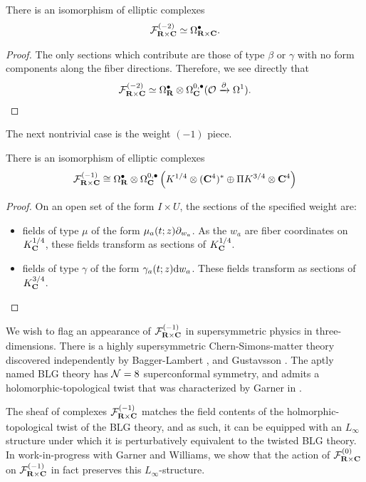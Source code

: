 \documentclass[../main.tex]{subfiles}
\begin{document}
\begin{lem}
There is an isomorphism of elliptic complexes \[\mathcal{F}^{(-2)}_{\mathbf{R}\times \mathbf{C}} \simeq \Omega^\bullet_{\mathbf{R}\times \mathbf{C}}.\]
\end{lem}
\begin{proof}
The only sections which contribute are those of type $\beta$ or $\gamma$ with no form components along the fiber directions. Therefore, we see directly that \[\mathcal{F}^{(-2)}_{\mathbf{R}\times \mathbf{C}} \simeq \Omega^\bullet _{\mathbf{R}} \otimes \Omega^{0,\bullet}_{\mathbf{C}} ( \mathcal{O} \xrightarrow{\partial} \Omega^1 ).\] 
\end{proof}

\parsec[] The next nontrivial case is the weight ${(-1)}$ piece. 

\begin{lem}
There is an isomorphism of elliptic complexes 
\[ \mathcal{F}^{(-1)}_{\mathbf{R}\times \mathbf{C}} \cong \Omega^\bullet _{\mathbf{R}} \otimes \Omega^{0,\bullet}_{\mathbf{C}} \left (K^{1/4}\otimes (\mathbf{C}^4)^* \oplus \Pi K^{3/4}\otimes \mathbf{C}^4 \right ) \]
\end{lem}
\begin{proof}
On an open set of the form $I\times U$, the sections of the specified weight are:
\begin{itemize}
\item fields of type $\mu$ of the form $\mu_a(t; z) \partial_{w_a}$. As the $w_a$ are fiber coordinates on $K^{1/4}_{\mathbf{C}}$, these fields transform as sections of $K^{1/4}_{\mathbf{C}}$.
\item fields of type $\gamma$ of the form $\gamma_a(t;z) \mathrm{d} w_a$. These fields transform as sections of $K^{3/4}_{\mathbf{C}}$. 
\end{itemize}
\end{proof}

\parsec[]
We wish to flag an appearance of $\mathcal{F}^{(-1)}_{\mathbf{R}\times \mathbf{C}}$ in supersymmetric physics in three-dimensions. There is a highly supersymmetric Chern-Simons-matter theory discovered independently by Bagger-Lambert \cite{Bagger_2007}, \cite{Bagger:2007jr} and Gustavsson \cite{Gustavsson:2007vu}. The aptly named BLG theory has $\mathcal{N}=8$ superconformal symmetry, and admits a holomorphic-topological twist that was characterized by Garner in \cite{Garner2022vds}.

The sheaf of complexes $\mathcal{F}^{(-1)}_{\mathbf{R}\times \mathbf{C}}$ matches the field contents of the holmorphic-topological twist of the BLG theory, and as such, it can be equipped with an $L_\infty$ structure under which it is perturbatively equivalent to the twisted BLG theory. In work-in-progress with Garner and Williams, we show that the action of $\mathcal{F}^{(0)}_{\mathbf{R}\times \mathbf{C}}$ on $\mathcal{F}^{(-1)}_{\mathbf{R}\times \mathbf{C}}$ in fact preserves this $L_\infty$-structure. 
\end{document}
